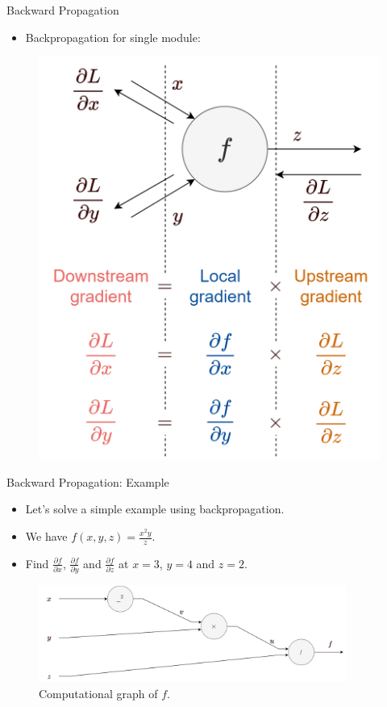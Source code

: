 \documentclass[compress,oilve,t]{beamer}
\begin{document}
\begin{frame}{Backward Propagation}
	\begin{itemize}
		\item Backpropagation for single module:
	\end{itemize}
	\begin{figure}[H]
		\centering
		\includegraphics[height=0.7\textheight]{Figs/module_f_chain_rule.png}
	\end{figure}
\end{frame}

\begin{frame}{Backward Propagation: Example}
	\begin{itemize}
		\item Let's solve a simple example using backpropagation.
		\medskip
		\item We have $f(x, y, z) = \frac{x^2 y}{z}$.
		\medskip
		\item Find $\frac{\partial f}{\partial x}$, $\frac{\partial f}{\partial y}$ and $\frac{\partial f}{\partial z}$ at $x=3$, $y=4$ and $z=2$.
		\medskip
	\end{itemize}
	\begin{figure}[H]
		\centering
		\includegraphics[width=0.9\textwidth]{Figs/backprop_e1.png}
		\caption{Computational graph of $f$.}
	\end{figure}
\end{frame}
\end{document}
